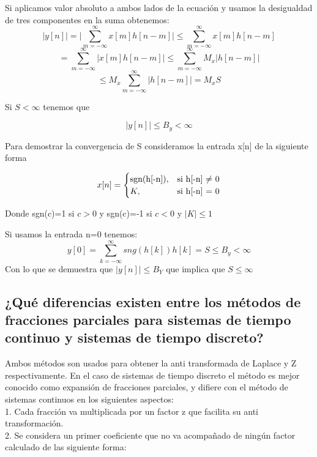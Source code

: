 	Si aplicamos valor absoluto a ambos lados de la ecuación y usamos la desigualdad de tres componentes en la suma obtenemos: 
	\begin{equation}
		\lvert y[n]\rvert = \lvert \sum_{m=-\infty}^{\infty}x[m]h[n-m] \rvert \leq \sum_{m=-\infty}^{\infty}x[m]h[n-m]
	\end{equation}		
	\begin{equation}
		=\sum_{m=-\infty}^{\infty}\lvert x[m]h[n-m] \rvert \leq \sum_{m=-\infty}^{\infty}M_x \lvert h[n-m] \rvert
	\end{equation}
	\begin{equation}
		\leq M_x \sum_{m=-\infty}^{\infty} \lvert h[n-m] \rvert = M_xS
	\end{equation}

	Si $S<\infty$ tenemos que 
	
	\begin{equation}
		|y[n]|\leq B_y < \infty
	\end{equation}
	
	Para demostrar la convergencia de S consideramos la entrada x[n] de la siguiente forma
	
	\[
	x[n]=
	\begin{cases}
		$sgn(h[-n])$, & \text{si h[-n]  $\neq$ 0} \\
		K, & \text{si h[-n] = 0}				\end{cases}
	\]
	
	Donde sgn(c)=1 si $c>0$ y sgn(c)=-1 si $c<0$ y $|K| \leq 1$
	\newline
	
	Si usamos la entrada n=0 tenemos:
	\begin{equation}
		y[0]=\sum_{k=-\infty}^\infty sng(h[k]) h[k] = S \leq B_y < \infty
	\end{equation}
	Con lo que se demuestra que $|y[n]| \leq B_Y$ que implica que $S\leq\infty$

\subsection{¿Qué diferencias existen entre los métodos de fracciones parciales para sistemas de tiempo continuo y sistemas de tiempo discreto?}

Ambos métodos son usados para obtener la anti transformada de Laplace y Z respectivamente. En el caso de sistemas de tiempo discreto el método es mejor conocido como expansión de fracciones parciales, y difiere con el método de sistemas continuos en los siguientes aspectos:\\
1. Cada fracción va multiplicada por un factor z que facilita su anti transformación.\\
2. Se considera un primer coeficiente que no va acompañado de ningún factor calculado de las siguiente forma:

